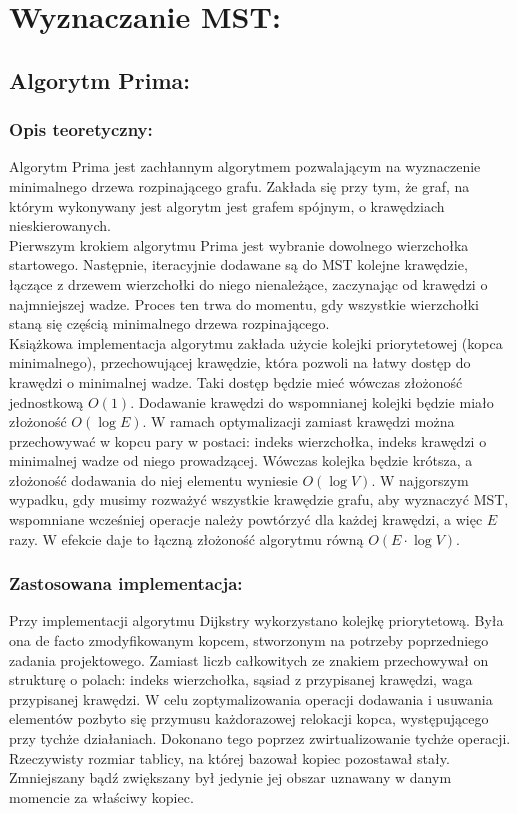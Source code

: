 \documentclass[a4paper,12pt]{article}
\begin{document}
\section{Wyznaczanie MST:}

\subsection{Algorytm Prima:}

\subsubsection{Opis teoretyczny:}
Algorytm Prima jest zachłannym algorytmem pozwalającym na wyznaczenie minimalnego drzewa rozpinającego grafu. Zakłada się przy tym, że graf, na którym wykonywany jest algorytm jest grafem spójnym, o krawędziach nieskierowanych.\\

\noindent
Pierwszym krokiem algorytmu Prima jest wybranie dowolnego wierzchołka startowego. Następnie, iteracyjnie dodawane są do MST kolejne krawędzie, łączące z drzewem wierzchołki do niego nienależące, zaczynając od krawędzi o najmniejszej wadze. Proces ten trwa do momentu, gdy wszystkie wierzchołki staną się częścią minimalnego drzewa rozpinającego.\\

\noindent
Książkowa implementacja algorytmu zakłada użycie kolejki priorytetowej (kopca minimalnego), przechowującej krawędzie, która pozwoli na łatwy dostęp do krawędzi o minimalnej wadze. Taki dostęp będzie mieć wówczas złożoność jednostkową $O(1)$. Dodawanie krawędzi do wspomnianej kolejki będzie miało złożoność $O(\log E)$. W ramach optymalizacji zamiast krawędzi można przechowywać w kopcu pary w postaci: indeks wierzchołka, indeks krawędzi o minimalnej wadze od niego prowadzącej. Wówczas kolejka będzie krótsza, a złożoność dodawania do niej elementu wyniesie $O(\log V)$. W najgorszym wypadku, gdy musimy rozważyć wszystkie krawędzie grafu, aby wyznaczyć MST, wspomniane wcześniej operacje należy powtórzyć dla każdej krawędzi, a więc $E$ razy. W efekcie daje to łączną złożoność algorytmu równą $O(E \cdot \log V)$.

\subsubsection{Zastosowana implementacja:}
Przy implementacji algorytmu Dijkstry wykorzystano kolejkę priorytetową. Była ona de facto zmodyfikowanym kopcem, stworzonym na potrzeby poprzedniego zadania projektowego. Zamiast liczb całkowitych ze znakiem przechowywał on strukturę o polach: indeks wierzchołka, sąsiad z przypisanej krawędzi, waga przypisanej krawędzi. W celu zoptymalizowania operacji dodawania i usuwania elementów pozbyto się przymusu każdorazowej relokacji kopca, występującego przy tychże działaniach. Dokonano tego poprzez zwirtualizowanie tychże operacji. Rzeczywisty rozmiar tablicy, na której bazował kopiec pozostawał stały. Zmniejszany bądź zwiększany był jedynie jej obszar uznawany w danym momencie za właściwy kopiec.\\
\end{document}
